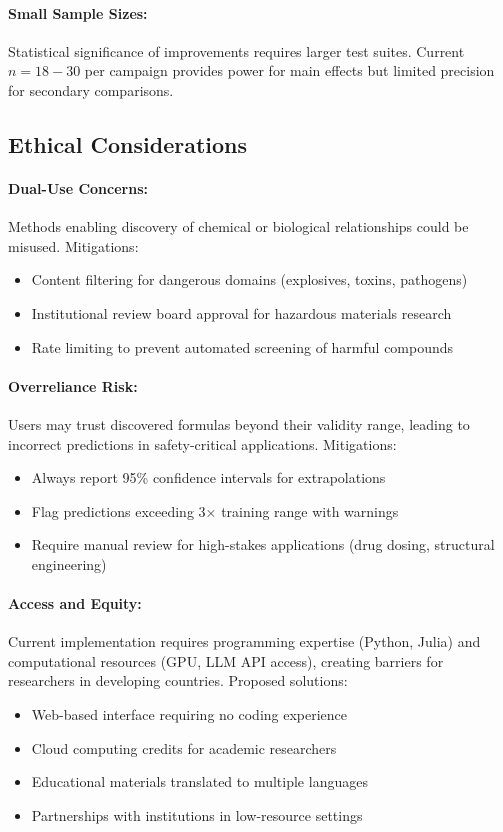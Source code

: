\documentclass[twoside,11pt]{article}
\begin{document}
\paragraph{Small Sample Sizes:} Statistical significance of improvements requires larger test suites. Current $n = 18-30$ per campaign provides power for main effects but limited precision for secondary comparisons.


\subsection{Ethical Considerations}

\paragraph{Dual-Use Concerns:} Methods enabling discovery of chemical or biological relationships could be misused. Mitigations:
\begin{itemize}
\item Content filtering for dangerous domains (explosives, toxins, pathogens)
\item Institutional review board approval for hazardous materials research
\item Rate limiting to prevent automated screening of harmful compounds
\end{itemize}

\paragraph{Overreliance Risk:} Users may trust discovered formulas beyond their validity range, leading to incorrect predictions in safety-critical applications. Mitigations:
\begin{itemize}
\item Always report 95\% confidence intervals for extrapolations
\item Flag predictions exceeding 3$\times$ training range with warnings
\item Require manual review for high-stakes applications (drug dosing, structural engineering)
\end{itemize}

\paragraph{Access and Equity:} Current implementation requires programming expertise (Python, Julia) and computational resources (GPU, LLM API access), creating barriers for researchers in developing countries. Proposed solutions:
\begin{itemize}
\item Web-based interface requiring no coding experience
\item Cloud computing credits for academic researchers
\item Educational materials translated to multiple languages
\item Partnerships with institutions in low-resource settings
\end{itemize}
\end{document}
